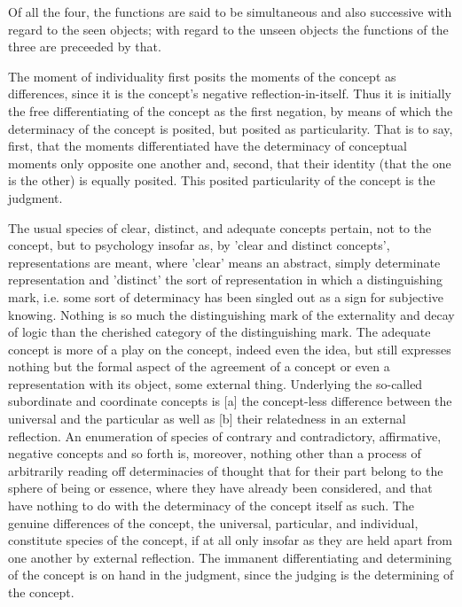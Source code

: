 Of all the four, the functions are said to be simultaneous and also successive
with regard to the seen objects; with regard to the unseen objects
the functions of the three are preceeded by that.

The moment of individuality first posits the moments of the concept as differences,
since it is the concept's negative reflection-in-itself.
Thus it is initially the free differentiating of the concept as the first negation,
by means of which the determinacy of the concept is posited, but posited as particularity.
That is to say, first, that the moments differentiated have
the determinacy of conceptual moments only opposite one another and,
second, that their identity (that the one is the other) is equally posited.
This posited particularity of the concept is the judgment.

    The usual species of clear, distinct, and adequate concepts pertain,
    not to the concept, but to psychology insofar as,
    by 'clear and distinct concepts', representations are meant,
    where 'clear' means an abstract, simply determinate representation and
    'distinct' the sort of representation in which a distinguishing mark,
    i.e. some sort of determinacy has been singled out as
    a sign for subjective knowing.
    Nothing is so much the distinguishing mark of the externality and
    decay of logic than the cherished category of the distinguishing mark.
    The adequate concept is more of a play on the concept,
    indeed even the idea, but still expresses nothing but
    the formal aspect of the agreement of a concept or
    even a representation with its object, some external thing.
    Underlying the so-called subordinate and coordinate concepts is
    [a] the concept-less difference between the universal and the particular
    as well as [b] their relatedness in an external reflection.
    An enumeration of species of contrary and contradictory,
    affirmative, negative concepts and so forth is, moreover, nothing other than a
    process of arbitrarily reading off determinacies of thought that
    for their part belong to the sphere of being or essence,
    where they have already been considered, and that have nothing to do
    with the determinacy of the concept itself as such.
    The genuine differences of the concept,
    the universal, particular, and individual,
    constitute species of the concept, if at all only insofar as
    they are held apart from one another by external reflection.
    The immanent differentiating and determining of
    the concept is on hand in the judgment,
    since the judging is the determining of the concept.

